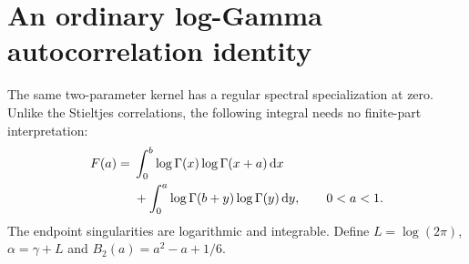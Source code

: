 \documentclass[11pt]{article}
\numberwithin{equation}{section}
\theoremstyle{definition}
\theoremstyle{remark}
\newcommand{\dd}{\,\mathrm d}
\begin{document}
\section{An ordinary log-Gamma autocorrelation identity}
\label{sec:loggamma}

The same two-parameter kernel has a regular spectral specialization at
zero. Unlike the Stieltjes correlations, the following integral needs no
finite-part interpretation:
\begin{align}
 F(a)={}&\int_0^b\log\Gamma(x)\log\Gamma(x+a)\dd x\notag\\
       &+\int_0^a\log\Gamma(b+y)\log\Gamma(y)\dd y,
 \qquad 0<a<1.
 \label{eq:F-definition}
\end{align}
The endpoint singularities are logarithmic and integrable. Define
$L=\log(2\pi)$, $\alpha=\gamma+L$ and
$B_2(a)=a^2-a+1/6$.
\end{document}

